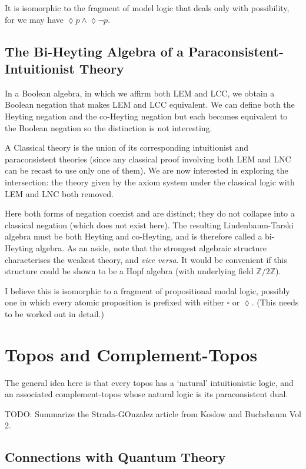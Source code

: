 \documentclass[oneside,english]{article}
\theoremstyle{plain}
\theoremstyle{definition}
\theoremstyle{definition}
\begin{document}
It is isomorphic to the fragment of model logic that deals only with possibility, for we may have $\lozenge p\land\lozenge\lnot p$.

\subsection{The Bi-Heyting Algebra of a Paraconsistent-Intuitionist Theory}

In a Boolean algebra, in which we affirm both LEM and LCC, we obtain a Boolean negation that makes LEM and LCC equivalent. We can define both the Heyting negation and the co-Heyting negation but each becomes equivalent to the Boolean negation so the distinction is not interesting.

A Classical theory is the union of its corresponding intuitionist and paraconsistent theories (since any classical proof involving both LEM and LNC can be recast to use only one of them). We are now interested in exploring the intersection: the theory given by the axiom system under the classical logic with LEM and LNC both removed.

Here both forms of negation coexist and are distinct; they do not collapse into a classical negation (which does not exist here). The resulting Lindenbaum-Tarski algebra must be both Heyting and co-Heyting, and is therefore called a bi-Heyting algebra. As an aside, note that the strongest algebraic structure characterises the weakest theory, and \emph{vice versa}. It would be convenient if this structure could be shown to be a Hopf algebra (with underlying field $\mathbb{Z}/2\mathbb{Z}$).

I believe this is isomorphic to a fragment of propositional modal logic, possibly one in which every atomic proposition is prefixed with either $\square$ or $\lozenge$. (This needs to be worked out in detail.)

\section{Topos and Complement-Topos}

The general idea here is that every topos has a `natural' intuitionistic logic, and an associated complement-topos whose natural logic is its paraconsistent dual.

TODO: Summarize the Strada-GOnzalez article from Koslow and Buchsbaum Vol 2.

\subsection{Connections with Quantum Theory}
\end{document}
